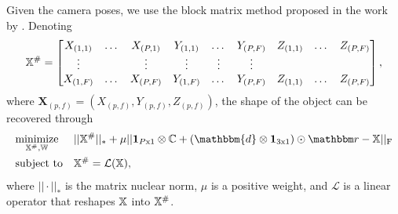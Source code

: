 Given the camera poses, we use the block matrix method proposed in the work by \citet{dai2014simple}. Denoting
\begin{equation}
\mathbb X^\# = 
\begin{bmatrix}
X_{(1,1)}& \dots& X_{(P,1)} & Y_{(1,1)}& \dots& Y_{(P,F)} & Z_{(1,1)}& \dots& Z_{(P,F)} \\
\vdots   &  				& \vdots   & \vdots 		  & \vdots   & \vdots			  \\
X_{(1,F)}& \dots& X_{(P,F)} & Y_{(1,F)}& \dots& Y_{(P,F)} & Z_{(1,1)}& \dots& Z_{(P,F)}\nonumber		  
\end{bmatrix},
\end{equation}
where $\mathbf{X}_{(p,f)} = (X_{(p,f)},Y_{(p,f)},Z_{(p,f)})$, the shape of the object can be recovered through 
\begin{equation}
\begin{aligned}
& \underset{\allX^\#, \allT}{\text{minimize}} &&
||\allX^\#||_* + \mu ||\mathbf{1}_{P\text{x}1} \otimes \allC + (\mathbbm{d} \otimes \mathbf{1}_{3\text{x}1}) \odot \allr - \allX||_{\text{F}}\\
&\text{subject to} && \allX^\# = \mathcal{L}(\allX), \nonumber
\end{aligned}
\end{equation}
where $||\cdot||_*$ is the matrix nuclear norm, $\mu$ is a positive weight, and $\mathcal{L}$ is a linear operator that reshapes $\mathbb X$ into $\mathbb X^\#$. 

